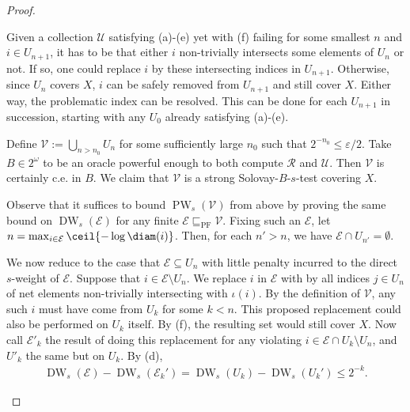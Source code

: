 \begin{proof}
\begin{enumerate}[label = (\roman*)]
\begin{enumerate}[label = (\alph*)]
            \end{enumerate}
            Given a collection $\mathcal{U}$ satisfying (a)-(e) yet with (f) failing for some smallest $n$ and $i \in U_{n + 1}$, it has to be that either $i$ non-trivially intersects some elements of $U_n$ or not. If so, one could replace $i$ by these intersecting indices in $U_{n + 1}$. Otherwise, since $U_n$ covers $X$, $i$ can be safely removed from $U_{n + 1}$ and still cover $X$. Either way, the problematic index can be resolved. This can be done for each $U_{n + 1}$ in succession, starting with any $U_0$ already satisfying (a)-(e). 
    
            Define $\mathcal{V} := \bigcup_{n > n_0} U_n$ for some sufficiently large $n_0$ such that $2^{-n_0} \leq \varepsilon / 2$. Take $B \in 2^\omega$ to be an oracle powerful enough to both compute $\mathscr{R}$ and $\mathcal{U}$. Then $\mathcal{V}$ is certainly c.e. in $B$. We claim that $\mathcal{V}$ is a strong Solovay-$B$-$s$-test covering $X$. 
            
            Observe that it suffices to bound $\operatorname{PW}_s(\mathcal{V})$ from above by proving the same bound on $\operatorname{DW}_s(\mathcal{E})$ for any finite $\mathcal{E} \sqsubseteq_{\operatorname{PF}} \mathcal{V}$. Fixing such an $\mathcal{E}$, let $n = \max_{i \in \mathcal{E}} \ceil{- \log \diam(i)}$. Then, for each $n' > n$, we have $\mathcal{E} \cap U_{n'} = \emptyset$. 
    
            We now reduce to the case that $\mathcal{E} \subseteq U_n$ with little penalty incurred to the direct $s$-weight of $\mathcal{E}$. Suppose that $i \in \mathcal{E} \setminus U_n$. We replace $i$ in $\mathcal{E}$ with by all indices $j \in U_n$ of net elements non-trivially intersecting with $\iota(i)$. By the definition of $\mathcal{V}$, any such $i$ must have come from $U_k$ for some $k < n$. This proposed replacement could also be performed on $U_k$ itself. By (f), the resulting set would still cover $X$. Now call $\mathcal{E}'_k$ the result of doing this replacement for any violating $i \in \mathcal{E} \cap U_k \setminus U_n$, and $U'_k$ the same but on $U_k$. By (d), 
            \begin{align*}
                \operatorname{DW}_s(\mathcal{E}) - \operatorname{DW}_s(\mathcal{E}_k') = \operatorname{DW}_s(U_k) - \operatorname{DW}_s(U_k') \leq 2^{-k}.
            \end{align*}
    

\end{enumerate}
\end{proof}
